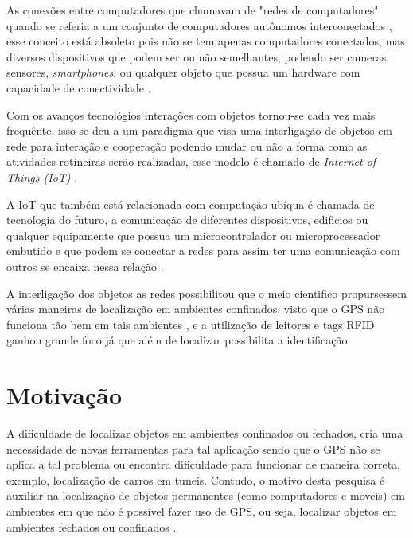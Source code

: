 
As conexões entre computadores que chamavam de 
"redes de computadores" quando se referia a um conjunto de computadores autônomos interconectados \cite{tenenbaum2002}, 
esse conceito está absoleto pois não se tem apenas computadores conectados, mas diversos dispositivos que podem ser ou 
não semelhantes, podendo ser cameras, sensores, \textit{smartphones}, ou qualquer objeto que possua um 
hardware com capacidade de conectividade \cite{iot2016SBRC}.


Com os avanços tecnológios interações com objetos tornou-se cada vez mais frequênte, isso se deu a um paradigma 
que visa uma interligação de objetos em rede para interação e cooperação podendo mudar ou não a forma como as atividades 
rotineiras serão realizadas, esse modelo é chamado de \textit{Internet of Things (IoT)} \cite{realtimeRFID2016}.


A IoT que também está relacionada com computação ubíqua é chamada de tecnologia do futuro, a comunicação de diferentes dispositivos, 
edificios ou qualquer equipamente que possua um microcontrolador ou microprocessador embutido e que podem se conectar a 
redes para assim ter uma comunicação com outros se encaixa nessa relação \cite{mechanismRFID2006}.


A interligação dos objetos as redes possibilitou que o meio cientifico propursessem várias maneiras de localização em ambientes 
confinados, visto que o GPS não funciona tão bem em tais ambientes \cite{mechanismRFID2006}, e a utilização de leitores e tags RFID 
ganhou grande foco já que além de localizar possibilita a identificação.


 \section{Motivação}
A dificuldade de localizar objetos em ambientes confinados ou fechados, cria uma necessidade de novas ferramentas para 
tal aplicação sendo que o GPS não se aplica a tal problema ou encontra dificuldade para funcionar de maneira correta, exemplo, 
localização de carros em tuneis. Contudo, o motivo desta pesquisa é auxiliar na localização de objetos permanentes (como computadores e moveis) 
em ambientes em que não é possível fazer uso de GPS, 
ou seja, localizar objetos em ambientes fechados ou confinados \cite{mechanismRFID2006}.

